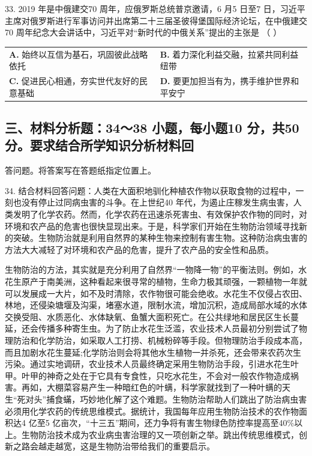 \documentclass[UTF8,11pt]{ctexart}
\begin{document}
33. 2019 年是中俄建交70 周年，应俄罗斯总统普京邀请，6 月5 日至7 日，习近平主席对俄罗斯进行军事访问并出席第二十三届圣彼得堡国际经济论坛，在中俄建交70 周年纪念大会讲话中，习近平对“新时代的中俄关系”提出的主张是 （    ）


\begin{center}\begin{tabular}{>{\raggedright\arraybackslash}p{\dimexpr(\linewidth-4\tabcolsep)/2\relax}>{\raggedright\arraybackslash}p{\dimexpr(\linewidth-4\tabcolsep)/2\relax}}
\textbf{A.} 始终以互信为基石，巩固彼此战略依托 & \textbf{B.} 着力深化利益交融，拉紧共同利益纽带\\[.35em]
\textbf{C.} 促进民心相通，夯实世代友好的民意基础 & \textbf{D.} 要更加担当有为，携手维护世界和平安宁\\[.35em]\end{tabular}\end{center}

\subsection*{三、材料分析题：34～38 小题，每小题10 分，共50 分。要求结合所学知识分析材料回}

答问题。将答案写在答题纸指定位置上。


34. 结合材料回答问题：人类在大面积地驯化种植农作物以获取食物的过程中，一刻也没有停止过同病虫害的斗争。在上世纪40 年代，为遏止庄稼发生病虫害，人类发明了化学农药。然而，化学农药在迅速杀死害虫、有效保护农作物的同时，对环境和农产品的危害也很快显现出来。于是，科学家们开始在生物防治领域寻找新的突破。生物防治就是利用自然界的某种生物来控制有害生物。这种防治病虫害的方法大大减轻了对环境和农产品的危害，提升了农产品的安全性和品质。

生物防治的方法，其实就是充分利用了自然界“一物降一物”的平衡法则。例如，水花生原产于南美洲，这种看起来很寻常的植物，生命力极其顽强，一颗植物一年就可以发展成一大片，如不及时清除，农作物很可能会绝收。水花生不仅侵占农田、林地，还侵染塘堰及沟渠，堵塞水道，限制水流，增加沉积，造成局部水域的水体交换受阻、水质恶化、水体缺氧、鱼蟹大面积死亡。在公共绿地和居民区生长蔓延，还会传播多种寄生虫。为了防止水花生泛滥，农业技术人员最初分别尝试了物理防治和化学防治，如采取人工打捞、机械粉碎等手段。但物理防治手段成本高，而且加剧水花生蔓延;化学防治则会将其他水生植物一并杀死，还会带来农药次生污染。通过实地调研，农业技术人员最终确定采用生物防治手段，引进水花生叶甲。叶甲的神奇之处在于它具有专食性，只吃水花生，不会对一般农作物造成祸害。再如，大棚菜容易产生一种暗红色的叶螨，科学家就找到了一种叶螨的天生“死对头”捕食蟎，巧妙地化解了这个难题。生物防治帮助人们跳出了防治病虫害必须用化学农药的传统思维模式。据统计，我国每年应用生物防治技术的农作物面积达4 亿至5 亿亩次，“十三五”期间，还力争将有害生物绿色防控率提高至40\%以上。生物防治技术成为农业病虫害治理的又一项创新之举。跳出传统思维模式，创新之路会越走越宽，这是生物防治带给我们的重要启示。
\end{document}
